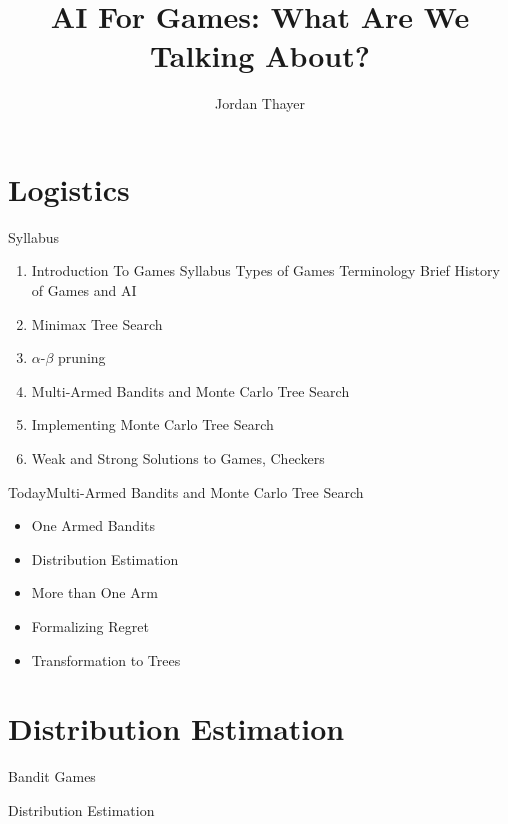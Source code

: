 \documentclass{powerdot}
\title{AI For Games: What Are We Talking About?}
\author{Jordan Thayer}
\date{\vspace{0.2in}}
\begin{document}
\maketitle

\section[slide=false]{Logistics}
\begin{slide}{Syllabus}
  \begin{enumerate}
    \item Introduction To Games
      \subitem Syllabus
      \subitem Types of Games
      \subitem Terminology
      \subitem Brief History of Games and AI
    \item Minimax Tree Search
    \item $\alpha$-$\beta$ pruning
    \item Multi-Armed Bandits and Monte Carlo Tree Search
    \item Implementing Monte Carlo Tree Search
    \item Weak and Strong Solutions to Games, Checkers
  \end{enumerate}
\end{slide}

\begin{slide}{Today\hfill Multi-Armed Bandits and Monte Carlo Tree Search}
  \begin{itemize}
    \item One Armed Bandits
    \item Distribution Estimation
    \item More than One Arm
    \item Formalizing Regret
    \item Transformation to Trees
  \end{itemize}
\end{slide}

\section{Distribution Estimation}

\begin{slide}{Bandit Games}
\end{slide}

\begin{slide}{Distribution Estimation}
\end{slide}
\end{document}
